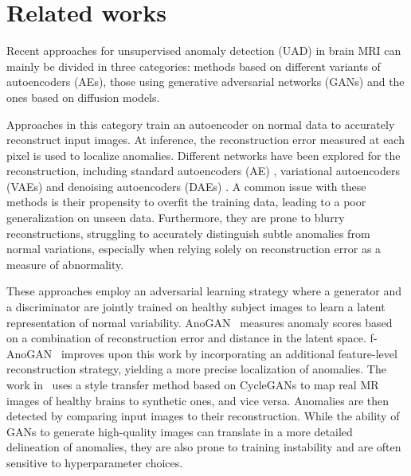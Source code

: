 \section{Related works}
Recent approaches for unsupervised anomaly detection (UAD) in brain MRI can mainly be divided in three categories: methods based on different variants of autoencoders (AEs), those using generative adversarial networks (GANs) and the ones based on diffusion models. 


 Approaches in this category train an autoencoder on normal data to accurately reconstruct input images. At inference, the reconstruction error measured at each pixel is used to localize anomalies. Different networks have been explored for the reconstruction, including standard autoencoders (AE) \cite{atlason2019unsupervised,baur2021autoencoders}, variational autoencoders (VAEs) \cite{baur2021autoencoders,silva2022constrained,zimmerer2019unsupervised} and denoising autoencoders (DAEs) \cite{kascenas2022denoising}. A common issue with these methods is their propensity to overfit the training data, leading to a poor generalization on unseen data. Furthermore, they are prone to blurry reconstructions, struggling to accurately distinguish subtle anomalies from normal variations, especially when relying solely on reconstruction error as a measure of abnormality.

 These approaches employ an adversarial learning strategy where a generator and a discriminator are jointly trained on healthy subject images to learn a latent representation of normal variability. AnoGAN~\cite{schlegl2017unsupervised} measures anomaly scores based on a combination of reconstruction error and distance in the latent space. f-AnoGAN~\cite{schlegl2019fast} improves upon this work by incorporating an additional feature-level reconstruction strategy, yielding a more precise localization of anomalies. The work in~\cite{baur2020steganomaly} uses a style transfer method based on CycleGANs to map real MR images of healthy brains to synthetic ones, and vice versa. Anomalies are then detected by comparing input images to their reconstruction. While the ability of GANs to generate high-quality images can translate in a more detailed delineation of anomalies, they are also prone to training instability and are often sensitive to hyperparameter choices.

